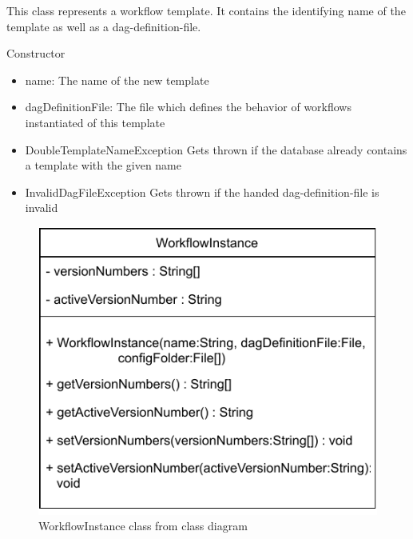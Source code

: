 This class represents a workflow template. It contains the identifying name of the template as well as a dag-definition-file.

\begin{methodenv}{Constructor}


\begin{itemize}
	\item{name:}
	The name of the new template
	\item{dagDefinitionFile:}
	The file which defines the behavior of workflows instantiated of this template
\end{itemize}

\begin{itemize}
	\item{DoubleTemplateNameException}
	Gets thrown if the database already contains a template with the given name
	\item{InvalidDagFileException}
	Gets thrown if the handed dag-definition-file is invalid
\end{itemize}
\end{methodenv}



\begin{figure}[h]
\centerline{\includegraphics[scale=1]{res/Klassen/WorkflowInstance.pdf}}
\caption{WorkflowInstance class from class diagram}
\end{figure}

